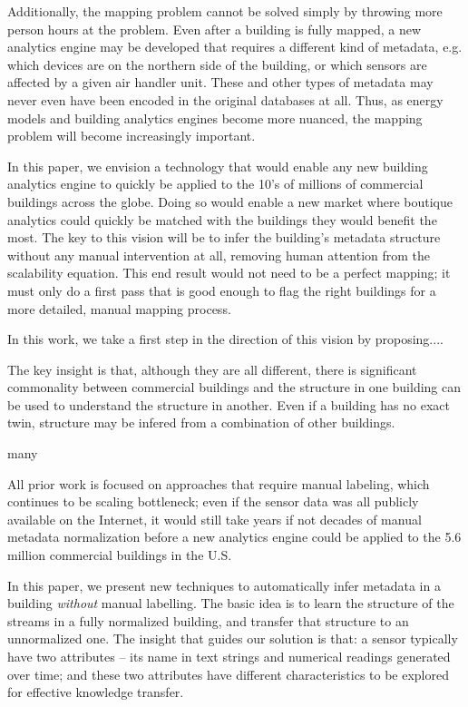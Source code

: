Additionally, the mapping problem cannot be solved simply by throwing more
person hours at the problem. Even after a building is fully mapped, a new
analytics engine may be developed that requires a different kind of metadata,
e.g. which devices are on the northern side of the building, or which sensors
are affected by a given air handler unit. These and other types of metadata may
never even have been encoded in the original databases at all. Thus, as energy
models and building analytics engines become more nuanced, the mapping problem
will become increasingly important.

In this paper, we envision a technology that would enable any new building
analytics engine to quickly be applied to the 10's of millions of commercial
buildings across the globe. Doing so would enable a new market where boutique
analytics could quickly be matched with the buildings they would benefit the
most. The key to this vision will be to infer the building's metadata structure
without any manual intervention at all, removing human attention from the
scalability equation. This end result would not need to be a perfect mapping; it
must only do a first pass that is good enough to flag the right buildings for a
more detailed, manual mapping process.

In this work, we take a first step in the direction of this vision by proposing....

The key insight is that, although they are all
different, there is significant commonality between commercial buildings and the
structure in one building can be used to understand the structure in
another. Even if a building has no exact twin, structure may be infered from a
combination of other buildings.




many

All prior work is focused on approaches that require manual labeling, which 
continues to be scaling bottleneck;
even if the sensor data was all publicly available on the Internet, it would still take years if not decades of manual metadata normalization before a new analytics engine could be applied to the 5.6 million commercial buildings in the U.S.

In this paper, we present new techniques to automatically infer metadata in a building {\it without} manual labelling. 
The basic idea is to learn the structure of the streams in a fully normalized building, and transfer that structure to an unnormalized one. 
The insight that guides our solution is that: a sensor typically have two attributes -- its name in text strings and numerical readings generated over time; and these two attributes have different characteristics to be explored for effective knowledge transfer. 

